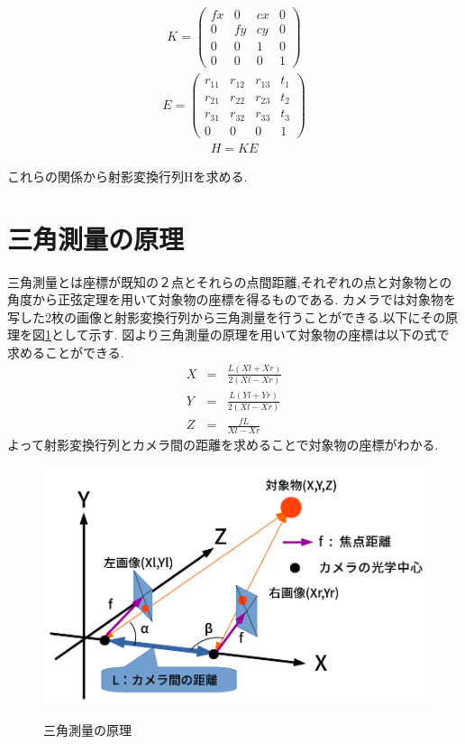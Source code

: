 \documentclass[12pt,oneside]{sotsuken_paper}
\begin{document}
\begin{eqnarray}
  K = \left(
    \begin{array}{cccc}
      fx & 0 & cx & 0\\
      0 & fy & cy & 0\\
      0 & 0 & 1 & 0\\
      0 & 0 & 0 & 1
    \end{array}
  \right)
\end{eqnarray}
\begin{eqnarray}
  E = \left(
    \begin{array}{cccc}
      r_{11} & r_{12} & r_{13} & t_1\\
      r_{21} & r_{22} & r_{23} & t_2\\
      r_{31} & r_{32} & r_{33} & t_3\\
      0 & 0 & 0 & 1
    \end{array}
  \right)
\end{eqnarray}
\begin{eqnarray}
  H = KE
\end{eqnarray}

これらの関係から射影変換行列Hを求める.
\section{三角測量の原理}
三角測量とは座標が既知の２点とそれらの点間距離,それぞれの点と対象物との角度から正弦定理を用いて対象物の座標を得るものである.
カメラでは対象物を写した2枚の画像と射影変換行列から三角測量を行うことができる.以下にその原理を図\ref{fig:sankaku1}として示す.
図より三角測量の原理を用いて対象物の座標は以下の式で求めることができる.
\begin{eqnarray}
	X&=&\frac{L(Xl+Xr)}{2(Xl-Xr)}\\
	Y&=&\frac{L(Yl+Yr)}{2(Xl-Xr)}\\
	Z&=&\frac{fL}{Xl-Xr}
\end{eqnarray}
よって射影変換行列とカメラ間の距離を求めることで対象物の座標がわかる.

\begin{figure}[htp]
 \begin{center}
  \includegraphics[width=120mm]{img/soft/sankaku1.png}
 　\caption{三角測量の原理}
  \label{fig:sankaku1}%
 \end{center}
\end{figure}
\end{document}
